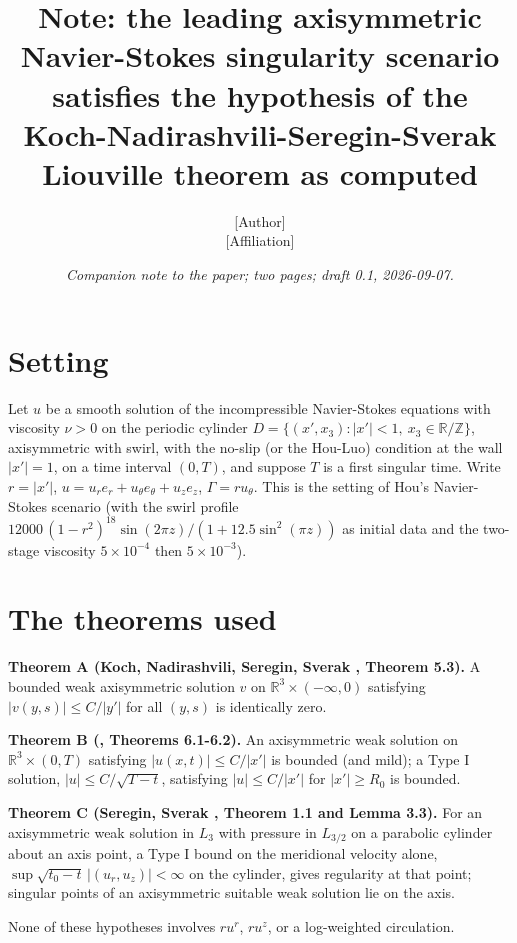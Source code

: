 \documentclass[11pt]{article}
\title{Note: the leading axisymmetric Navier-Stokes singularity scenario satisfies the hypothesis of the Koch-Nadirashvili-Seregin-Sverak Liouville theorem as computed}
\author{[Author]\\ {}[Affiliation]}
\date{\emph{Companion note to the paper; two pages; draft 0.1, 2026-09-07.}}
\newcommand{\sn}[2]{#1\times 10^{#2}}
\begin{document}
\maketitle

\section{Setting}

Let $u$ be a smooth solution of the incompressible Navier-Stokes equations with viscosity $\nu > 0$ on the periodic cylinder $D = \{(x', x_3) : |x'| < 1,\ x_3 \in \mathbb{R} / \mathbb{Z}\}$, axisymmetric with swirl, with the no-slip (or the Hou-Luo) condition at the wall $|x'| = 1$, on a time interval $(0, T)$, and suppose $T$ is a first singular time. Write $r = |x'|$, $u = u_r e_r + u_\theta e_\theta + u_z e_z$, $\Gamma = r u_\theta$. This is the setting of Hou's Navier-Stokes scenario \cite{H23b} (with the swirl profile $12000\,(1 - r^2)^{18} \sin(2 \pi z) / (1 + 12.5 \sin^2(\pi z))$ as initial data and the two-stage viscosity $\sn{5}{-4}$ then $\sn{5}{-3}$).

\section{The theorems used}

\noindent\textbf{Theorem A (Koch, Nadirashvili, Seregin, Sverak \cite{KNSS09}, Theorem 5.3).} A bounded weak axisymmetric solution $v$ on $\mathbb{R}^3 \times (-\infty, 0)$ satisfying $|v(y, s)| \le C / |y'|$ for all $(y, s)$ is identically zero.

\medskip
\noindent\textbf{Theorem B (\cite{KNSS09}, Theorems 6.1-6.2).} An axisymmetric weak solution on $\mathbb{R}^3 \times (0, T)$ satisfying $|u(x, t)| \le C / |x'|$ is bounded (and mild); a Type I solution, $|u| \le C / \sqrt{T - t}$, satisfying $|u| \le C / |x'|$ for $|x'| \ge R_0$ is bounded.

\medskip
\noindent\textbf{Theorem C (Seregin, Sverak \cite{SS09}, Theorem 1.1 and Lemma 3.3).} For an axisymmetric weak solution in $L_3$ with pressure in $L_{3/2}$ on a parabolic cylinder about an axis point, a Type I bound on the meridional velocity alone, $\sup \sqrt{t_0 - t}\, |(u_r, u_z)| < \infty$ on the cylinder, gives regularity at that point; singular points of an axisymmetric suitable weak solution lie on the axis.

\medskip
None of these hypotheses involves $r u^r$, $r u^z$, or a log-weighted circulation.
\end{document}
